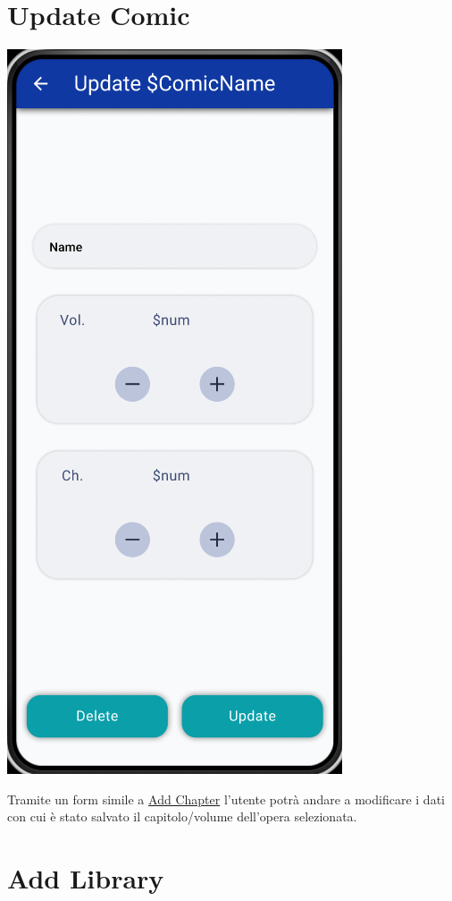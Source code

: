 \documentclass{report}
\begin{document}
\section{Update Comic}\label{sec:update_comic}

\begin{center}
  \includegraphics[scale=0.4]{update_library.png}
\end{center}

Tramite un form simile a \hyperref[sec:add_chapter]{Add Chapter} l'utente potrà andare a modificare i dati con cui è stato salvato il capitolo/volume dell'opera selezionata.

\section{Add Library}\label{sec:add_library}
\end{document}
